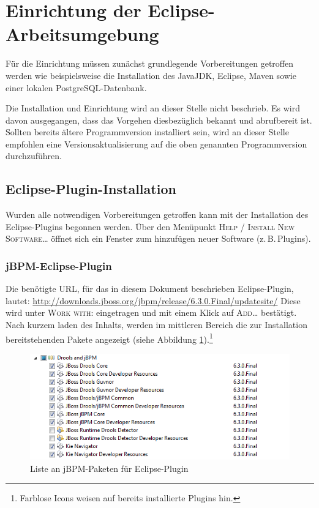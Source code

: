 \section{Einrichtung der Eclipse-Arbeitsumgebung}
Für die Einrichtung müssen zunächst grundlegende Vorbereitungen getroffen werden wie beispielsweise die Installation des JavaJDK, Eclipse, Maven sowie einer lokalen PostgreSQL-Datenbank.

Die Installation und Einrichtung wird an dieser Stelle nicht beschrieb. Es wird davon ausgegangen, dass das Vorgehen diesbezüglich bekannt und abrufbereit ist. Sollten bereits ältere Programmversion installiert sein, wird an dieser Stelle empfohlen eine Versionsaktualisierung auf die oben genannten Programmversion durchzuführen.

\subsection{Eclipse-Plugin-Installation}
Wurden alle notwendigen Vorbereitungen getroffen kann mit der Installation des Eclipse-Plugins begonnen werden. Über den Menüpunkt \textsc{Help / Install New Software\ldots} öffnet sich ein Fenster zum hinzufügen neuer Software (z.\,B.\,Plugins).

\subsubsection{jBPM-Eclipse-Plugin}
Die benötigte URL, für das in diesem Dokument beschrieben Eclipse-Plugin, lautet: \href{http://downloads.jboss.org/jbpm/release/6.3.0.Final/updatesite/}{http://downloads.jboss.org/jbpm/release/6.3.0.Final/updatesite/}
Diese wird unter \textsc{Work with:} eingetragen und mit einem Klick auf \textsc{Add\ldots} bestätigt. Nach kurzem laden des Inhalts, werden im mittleren Bereich die zur Installation bereitstehenden Pakete angezeigt (siehe Abbildung \ref{fig:install-jbpm-package-list}).\footnote{Farblose Icons weisen auf bereits installierte Plugins hin.}
\begin{figure}[h]
	\centering
	\includegraphics[width=\textwidth]{image/screenshots/install-jbpm-plugin}
	\caption{Liste an jBPM-Paketen für Eclipse-Plugin}\label{fig:install-jbpm-package-list}
\end{figure}